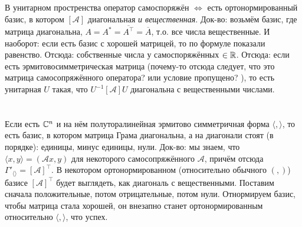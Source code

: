 \section{} %
В унитарном простренства оператор самоспоряжён $\iff$ есть ортонормированный базис, в котором $[ \mathcal A ]$ диагональная \textit{и вещественная}.
Док-во: возьмём базис, где матрица диагональна, $A = A^* = \overline{A^\top} = \overline{A}$, т.о. все числа вещественные.
И наоборот: если есть базис с хорошей матрицей, то по формуле показали равенство.
Отсюда: собственные числа у самоспоряжённых $\in \mathbb{R}$.
Отсюда: если есть эрмитовосимметрическая матрица (почему-то отсюда следует, что это матрица самосопряжённого оператора? или условие пропущено? \TODO), то есть унитарная $U$ такая, что $U^{-1}[\mathcal A]U$ диагональна с вещественными числами.

\section{} %
Если есть $\mathbb{C}^n$ и на нём полуторалинейная эрмитово симметричная форма $\langle , \rangle$, то есть
базис, в котором матрица Грама диагональна, а на диагонали стоят (в порядке): единицы, минус единицы, нули.
Док-во: мы знаем, что $\langle x, y \rangle = (\mathcal Ax, y)$ для некоторого самосопряжённого $\mathcal A$,
причём отсюда $\Gamma'_{\langle \rangle} = [\mathcal A]^\top$.
В некотором ортонормированном (относительно обычного $(,)$) базисе $[\mathcal A]^\top$ будет выглядеть, как диагональ с вещественными.
Поставим сначала положительные, потом отрицательные, потом нули.
Отнормируем базис, чтобы матрица стала хорошей, он внезапно станет ортонормированным относительно $\langle , \rangle$, что успех.

\section{} %

\TODO
